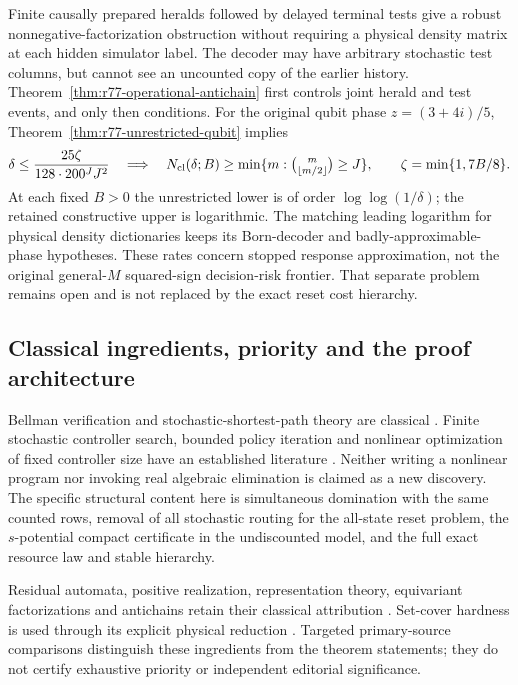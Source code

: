 Finite causally prepared heralds followed by delayed terminal tests
give a robust nonnegative-factorization obstruction without requiring
a physical density matrix at each hidden simulator label.  The
decoder may have arbitrary stochastic test columns, but cannot see an
uncounted copy of the earlier history.  Theorem~\ref{thm:r77-operational-antichain}
first controls joint herald and test events, and only then conditions.
For the original qubit phase $z=(3+4i)/5$,
Theorem~\ref{thm:r77-unrestricted-qubit} implies
\begin{equation}\label{eq:r77-intro-arithmetic}
 \delta\le\frac{25\zeta}{128\cdot200^J J^2}
 \quad\Longrightarrow\quad N_{\rm cl}(\delta;B)\ge
 \min\{m:\tbinom m{\lfloor m/2\rfloor}\ge J\},
 \qquad\zeta=\min\{1,7B/8\}.
\end{equation}
At each fixed $B>0$ the unrestricted lower is of order
$\log\log(1/\delta)$; the retained constructive upper is logarithmic.
The matching leading logarithm for physical density dictionaries keeps
its Born-decoder and badly-approximable-phase hypotheses.  These rates
concern stopped response approximation, not the original general-$M$
squared-sign decision-risk frontier.  That separate problem remains
open and is not replaced by the exact reset cost hierarchy.

\subsection*{Classical ingredients, priority and the proof architecture}

Bellman verification and stochastic-shortest-path theory are classical
\cite{BertsekasTsitsiklis91}.  Finite stochastic controller search,
bounded policy iteration and nonlinear optimization of fixed controller
size have an established literature
\cite{Meuleau99,PoupartBoutilier03,AmatoBernsteinZilberstein10}.
Neither writing a nonlinear program nor invoking real algebraic
elimination is claimed as a new discovery.  The specific structural
content here is simultaneous domination with the same counted rows,
removal of all stochastic routing for the all-state reset problem,
the $s$-potential compact certificate in the undiscounted model,
and the full exact resource law and stable hierarchy.

Residual automata, positive realization, representation theory,
equivariant factorizations and antichains retain their classical
attribution \cite{RabinScott59,Rabin63,Heller65,CarlylePaz71,
BenvenutiFarina04,Schwarz64,Flor69,Serre77,GPT13,VandaeleGillisGlineur17}.
Set-cover hardness is used through its explicit physical reduction
\cite{Karp72}.  Targeted primary-source comparisons distinguish these
ingredients from the theorem statements; they do not certify
exhaustive priority or independent editorial significance.

